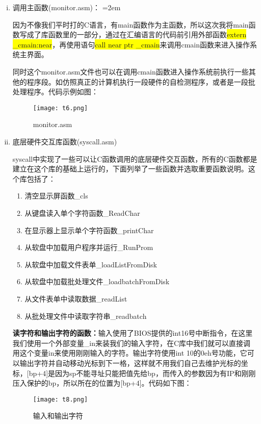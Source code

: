 \documentclass[UTF8]{article}
\begin{document}
\begin{enumerate}[1)]
	\begin{enumerate}[i)]
		\item 调用主函数(monitor.asm)：
\parindent=2em
{\par 因为不像我们平时打的C语言，有main函数作为主函数，所以这次我将main函数写成了库函数里的一部分，通过在汇编语言的代码前引用外部函数{\colorbox{yellow}{extern \_cmain:near}}，再使用语句{\colorbox{yellow}{call near ptr \_cmain}}来调用cmain函数来进入操作系统主界面。
\par 同时这个monitor.asm文件也可以在调用cmain函数进入操作系统前执行一些其他的程序段。如仿照真正的计算机执行一段硬件的自检测程序，或者是一段批处理程序。代码示例如图：}
		\begin{figure}[htbp]
			\centering
			\texttt{[image: t6.png]}
			\caption{monitor.asm}
		\end{figure}	
		\item 底层硬件交互库函数(syscall.asm)
		{\par syscall中实现了一些可以让C函数调用的底层硬件交互函数，所有的C函数都是建立在这个库的基础上运行的，下面列举了一些函数并选取重要函数说明。这个库包括了：}
		\begin{enumerate}[-]
		\item 清空显示屏函数\_cls
		\item 从键盘读入单个字符函数\_ReadChar
		\item 在显示器上显示单个字符函数\_printChar
		\item 从软盘中加载用户程序并运行\_RunProm
		\item 从软盘中加载文件表单\_loadListFromDisk
		\item 从软盘中加载批处理文件\_loadbatchFromDisk
		\item 从文件表单中读取数据\_readList
		\item 从批处理文件中读取字符串\_readbatch
		\end{enumerate}
		\vspace{0.2cm}
		{{\bfseries 读字符和输出字符的函数：}输入使用了BIOS提供的int16号中断指令，在这里我们使用一个外部变量\_in来装我们的输入字符，在C库中我们就可以直接调用这个变量in来使用刚刚输入的字符。输出字符使用int 10的0eh号功能，它可以输出字符并自动移动光标到下一格，这样就不用我们自己去维护光标的坐标，[bp+4]是因为sp不能寻址只能把值先给bp，而传入的参数因为有IP和刚刚压入保护的bp，所以所在的位置为[bp+4]。代码如下图：}
		\begin{figure}[htbp]
			\centering
			\texttt{[image: t8.png]}
			\caption{输入和输出字符}
		\end{figure}
		\\

\end{enumerate}
\end{enumerate}
\end{document}
